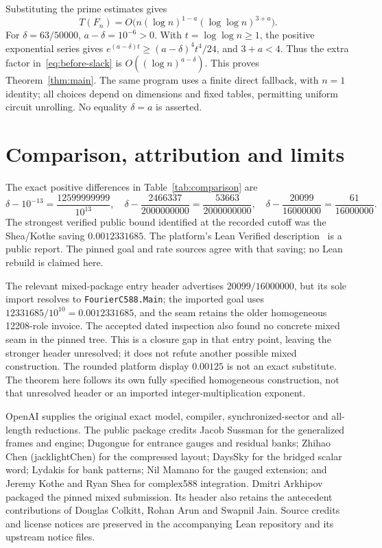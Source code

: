 \documentclass[11pt]{amsart}
\theoremstyle{remark}
\begin{document}
Substituting the prime estimates gives
\begin{equation}\label{eq:before-slack}
 T(F_n)=O\bigl(n(\log n)^{1-a}(\log\log n)^{3+a}\bigr).
\end{equation}
For $\delta=63/50000$, $a-\delta=10^{-6}>0$. With
$t=\log\log n\ge1$, the positive exponential series gives
$e^{(a-\delta)t}\ge(a-\delta)^4t^4/24$, and $3+a<4$.
Thus the extra factor in~\eqref{eq:before-slack} is
$O((\log n)^{a-\delta})$. This proves Theorem~\ref{thm:main}.
The same program uses a finite direct fallback, with $n=1$ identity;
all choices depend on dimensions and fixed tables, permitting uniform
circuit unrolling. No equality $\delta=a$ is asserted.

\section{Comparison, attribution and limits}
The exact positive differences in Table~\ref{tab:comparison} are
\[
 \delta-10^{-13}=\frac{12599999999}{10^{13}},\quad
 \delta-\frac{2466337}{2000000000}=\frac{53663}{2000000000},\quad
 \delta-\frac{20099}{16000000}=\frac{61}{16000000}.
\]
The strongest verified public bound identified at the recorded cutoff
was the Shea/Kothe saving $0.0012331685$. The platform's Lean Verified
description~\cite{BigOSpeedrun2026} is a public report. The pinned goal
and rate sources agree with that saving; no Lean rebuild is claimed here.

The relevant mixed-package entry header advertises $20099/16000000$,
but its sole import resolves to \texttt{FourierC588.Main}; the imported
goal uses $12331685/10^{10}=0.0012331685$, and the seam retains the
older homogeneous 12208-role invoice. The accepted dated inspection
also found no concrete mixed seam in the pinned tree. This is a
closure gap in that entry point, leaving the stronger header unresolved;
it does not refute another possible mixed construction. The rounded
platform display $0.00125$ is not an exact substitute. The theorem
here follows its own fully specified homogeneous construction, not
that unresolved header or an imported integer-multiplication exponent.

OpenAI supplies the original exact model, compiler, synchronized-sector
and all-length reductions. The public package credits Jacob Sussman
for the generalized frames and engine; Dugongue for entrance gauges
and residual banks; Zhihao Chen (jacklightChen) for the compressed
layout; DaysSky for the bridged scalar word; Lydakis for bank patterns;
Nil Mamano for the gauged extension; and Jeremy Kothe and Ryan Shea
for complex588 integration. Dmitri Arkhipov packaged the pinned mixed
submission. Its header also retains the antecedent contributions of
Douglas Colkitt, Rohan Arun and Swapnil Jain. Source credits and license notices are preserved in the accompanying
Lean repository and its upstream notice files.
\end{document}
